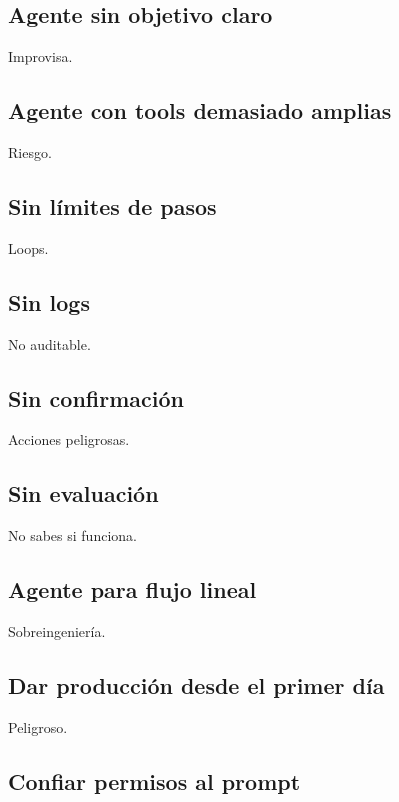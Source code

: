 \subsection{Agente sin objetivo claro}\label{agente-sin-objetivo-claro}

Improvisa.

\subsection{Agente con tools demasiado
amplias}\label{agente-con-tools-demasiado-amplias}

Riesgo.

\subsection{Sin límites de pasos}\label{sin-luxedmites-de-pasos}

Loops.

\subsection{Sin logs}\label{sin-logs-3}

No auditable.

\subsection{Sin confirmación}\label{sin-confirmaciuxf3n}

Acciones peligrosas.

\subsection{Sin evaluación}\label{sin-evaluaciuxf3n-1}

No sabes si funciona.

\subsection{Agente para flujo lineal}\label{agente-para-flujo-lineal}

Sobreingeniería.

\subsection{Dar producción desde el primer
día}\label{dar-producciuxf3n-desde-el-primer-duxeda}

Peligroso.

\subsection{Confiar permisos al
prompt}\label{confiar-permisos-al-prompt}

